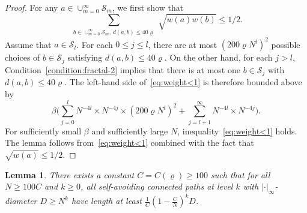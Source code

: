 \documentclass[a4paper]{article}
\numberwithin{equation}{section}
\newtheorem{lemma}[theorem]{Lemma}
\numberwithin{equation}{section}
\renewcommand{\1}{\mathbf{1}}
\begin{document}
\begin{proof}
    For any $a \in \cup_{m=0}^\infty \mathcal{S}_m$, we first show that
    \begin{equation}\label{eq:weight<1}
        \sum_{ \substack{b \in \cup_{m=0}^\infty \mathcal S_m,\, d(a,b) \leq 40 \varrho}} \sqrt{w(a) w(b)} \leq 1/2.
    \end{equation}
    Assume that $a \in \mathcal{S}_l$. For each $0 \leq j \leq l$, there are at most $(200 \varrho N^l)^2$ possible choices of $b \in \mathcal{S}_j$ satisfying $d(a,b) \leq 40 \varrho$. On the other hand, for each $j > l$, Condition~\ref{condition:fractal-2} implies that there is at most one $b \in \mathcal{S}_j$ with $d(a,b) \leq 40 \varrho$. The left-hand side of~\eqref{eq:weight<1} is therefore bounded above by
    $$
    \beta \Big(\sum_{j=0}^l N^{-4l} \times N^{-4j} \times (200 \varrho N^l)^2 +  \sum_{j=l+1}^\infty N^{-4l} \times N^{-4j} \Big).
    $$
    For sufficiently small $\beta$ and sufficiently large $N$, inequality~\eqref{eq:weight<1} holds. The lemma follows from~\eqref{eq:weight<1} combined with the fact that $\sqrt{w(a)} \leq 1/2$.
\end{proof}

\begin{lemma}\label{lem:length-bound}
    There exists a constant $C = C(\varrho) \geq 100$ such that for all $N \geq 100 C$ and $k \geq 0$, all self-avoiding connected paths at level $k$ with $|\cdot|_\infty$-diameter $D \geq N^k$ have length at least $\frac{1}{C}(1 - \frac{C}{N})^kD$.
\end{lemma}
\end{document}
